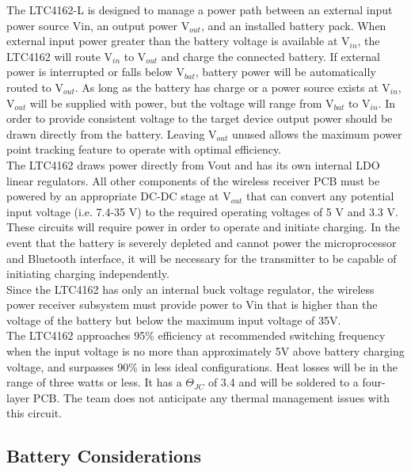 \documentclass[12pt]{article}
\begin{document}
\indent \indent
The LTC4162-L is designed to manage a power path between an external input power source Vin, an output power V$_{out}$, and an installed battery pack. When external input power greater than the battery voltage is available at V$_{in}$, the LTC4162 will route V$_{in}$ to V$_{out}$ and charge the connected battery. If external power is interrupted or falls below V$_{bat}$, battery power will be automatically routed to V$_{out}$. As long as the battery has charge or a power source exists at V$_{in}$, V$_{out}$ will be supplied with power, but the voltage will range from V$_{bat}$ to V$_{in}$. In order to provide consistent voltage to the target device output power should be drawn directly from the battery. Leaving V$_{out}$ unused allows the maximum power point tracking feature to operate with optimal efficiency.\\

\indent
The LTC4162 draws power directly from Vout and has its own internal LDO linear regulators. All other components of the wireless receiver PCB must be powered by an appropriate DC-DC stage at V$_{out}$ that can convert any potential input voltage (i.e. 7.4-35 V) to the required operating voltages of 5 V and 3.3 V. These circuits will require power in order to operate and initiate charging. In the event that the battery is severely depleted and cannot power the microprocessor and Bluetooth interface, it will be necessary for the transmitter to be capable of initiating charging independently.\\

\indent
Since the LTC4162 has only an internal buck voltage regulator, the wireless power receiver subsystem must provide power to Vin that is higher than the voltage of the battery but below the maximum input voltage of 35V.\\

\indent
The LTC4162 approaches 95\% efficiency at recommended switching frequency when the input voltage is no more than approximately 5V above battery charging voltage, and surpasses 90\% in less ideal configurations. Heat losses will be in the range of three watts or less. It has a $\Theta_{JC}$ of 3.4  and will be soldered to a four-layer PCB. The team does not anticipate any thermal management issues with this circuit.

\subsection{Battery Considerations}
\end{document}
